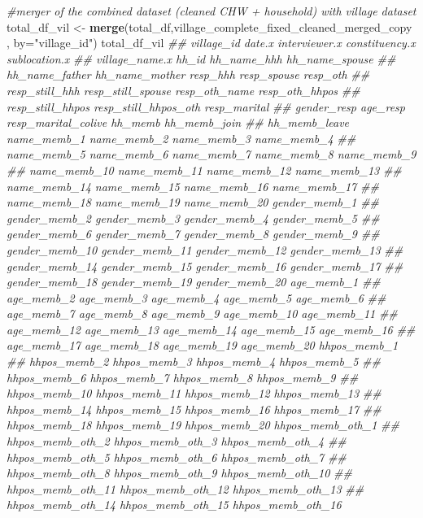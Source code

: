\documentclass[
]{article}
\newenvironment{Shaded}{\begin{snugshade}}{\end{snugshade}}
\newcommand{\CommentTok}[1]{\textcolor[rgb]{0.56,0.35,0.01}{\textit{#1}}}
\newcommand{\DataTypeTok}[1]{\textcolor[rgb]{0.13,0.29,0.53}{#1}}
\newcommand{\KeywordTok}[1]{\textcolor[rgb]{0.13,0.29,0.53}{\textbf{#1}}}
\newcommand{\NormalTok}[1]{#1}
\newcommand{\StringTok}[1]{\textcolor[rgb]{0.31,0.60,0.02}{#1}}
\begin{document}
\begin{Shaded}
\begin{Highlighting}[]
\CommentTok{#merger of the combined dataset (cleaned CHW + household) with village dataset}
\NormalTok{total_df_vil <-}\StringTok{ }\KeywordTok{merge}\NormalTok{(total_df,village_complete_fixed_cleaned_merged_copy , }\DataTypeTok{by=}\StringTok{"village_id"}\NormalTok{)}
\NormalTok{total_df_vil}
\CommentTok{##      village_id date.x interviewer.x constituency.x sublocation.x}
\CommentTok{##      village_name.x hh_id hh_name_hhh hh_name_spouse}
\CommentTok{##      hh_name_father hh_name_mother resp_hhh resp_spouse resp_oth}
\CommentTok{##      resp_still_hhh resp_still_spouse resp_oth_name resp_oth_hhpos}
\CommentTok{##      resp_still_hhpos resp_still_hhpos_oth resp_marital}
\CommentTok{##      gender_resp age_resp resp_marital_colive hh_memb hh_memb_join}
\CommentTok{##      hh_memb_leave name_memb_1 name_memb_2 name_memb_3 name_memb_4}
\CommentTok{##      name_memb_5 name_memb_6 name_memb_7 name_memb_8 name_memb_9}
\CommentTok{##      name_memb_10 name_memb_11 name_memb_12 name_memb_13}
\CommentTok{##      name_memb_14 name_memb_15 name_memb_16 name_memb_17}
\CommentTok{##      name_memb_18 name_memb_19 name_memb_20 gender_memb_1}
\CommentTok{##      gender_memb_2 gender_memb_3 gender_memb_4 gender_memb_5}
\CommentTok{##      gender_memb_6 gender_memb_7 gender_memb_8 gender_memb_9}
\CommentTok{##      gender_memb_10 gender_memb_11 gender_memb_12 gender_memb_13}
\CommentTok{##      gender_memb_14 gender_memb_15 gender_memb_16 gender_memb_17}
\CommentTok{##      gender_memb_18 gender_memb_19 gender_memb_20 age_memb_1}
\CommentTok{##      age_memb_2 age_memb_3 age_memb_4 age_memb_5 age_memb_6}
\CommentTok{##      age_memb_7 age_memb_8 age_memb_9 age_memb_10 age_memb_11}
\CommentTok{##      age_memb_12 age_memb_13 age_memb_14 age_memb_15 age_memb_16}
\CommentTok{##      age_memb_17 age_memb_18 age_memb_19 age_memb_20 hhpos_memb_1}
\CommentTok{##      hhpos_memb_2 hhpos_memb_3 hhpos_memb_4 hhpos_memb_5}
\CommentTok{##      hhpos_memb_6 hhpos_memb_7 hhpos_memb_8 hhpos_memb_9}
\CommentTok{##      hhpos_memb_10 hhpos_memb_11 hhpos_memb_12 hhpos_memb_13}
\CommentTok{##      hhpos_memb_14 hhpos_memb_15 hhpos_memb_16 hhpos_memb_17}
\CommentTok{##      hhpos_memb_18 hhpos_memb_19 hhpos_memb_20 hhpos_memb_oth_1}
\CommentTok{##      hhpos_memb_oth_2 hhpos_memb_oth_3 hhpos_memb_oth_4}
\CommentTok{##      hhpos_memb_oth_5 hhpos_memb_oth_6 hhpos_memb_oth_7}
\CommentTok{##      hhpos_memb_oth_8 hhpos_memb_oth_9 hhpos_memb_oth_10}
\CommentTok{##      hhpos_memb_oth_11 hhpos_memb_oth_12 hhpos_memb_oth_13}
\CommentTok{##      hhpos_memb_oth_14 hhpos_memb_oth_15 hhpos_memb_oth_16}

\end{Highlighting}
\end{Shaded}
\end{document}
